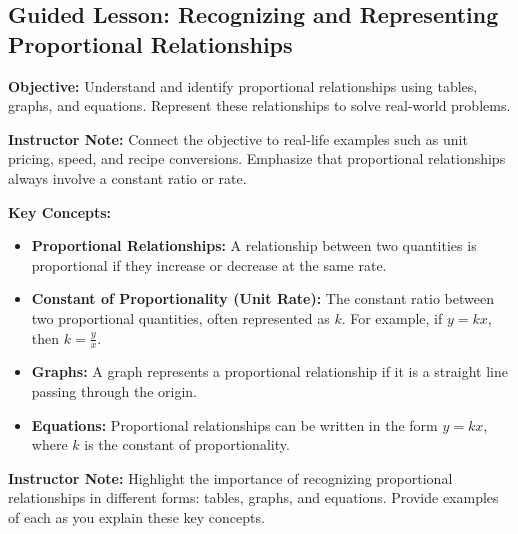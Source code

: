 \documentclass[12pt]{article}
\title{}
\date{}
\begin{document}
\subsection*{Guided Lesson: Recognizing and Representing Proportional Relationships}
\onehalfspacing

\begin{tcolorbox}[colframe=black!40, colback=gray!5, 
coltitle=black, colbacktitle=black!20, fonttitle=\bfseries\Large, 
title=Learning Objective, halign title=center, left=5pt, right=5pt, top=5pt, bottom=15pt]
\textbf{Objective:} Understand and identify proportional relationships using tables, graphs, and equations. Represent these relationships to solve real-world problems.

{\color{blue} \textbf{Instructor Note:} Connect the objective to real-life examples such as unit pricing, speed, and recipe conversions. Emphasize that proportional relationships always involve a constant ratio or rate.}
\end{tcolorbox}

\vspace{1em}

\begin{tcolorbox}[colframe=black!60, colback=white, 
coltitle=black, colbacktitle=black!15, fonttitle=\bfseries\Large, 
title=Key Concepts and Vocabulary, halign title=center, left=10pt, right=10pt, top=10pt, bottom=15pt]
\textbf{Key Concepts:}
\begin{itemize}
    \item \textbf{Proportional Relationships:} A relationship between two quantities is proportional if they increase or decrease at the same rate. 
    \item \textbf{Constant of Proportionality (Unit Rate):} The constant ratio between two proportional quantities, often represented as \(k\). For example, if \( y = kx \), then \(k = \frac{y}{x}\).
    \item \textbf{Graphs:} A graph represents a proportional relationship if it is a straight line passing through the origin.
    \item \textbf{Equations:} Proportional relationships can be written in the form \(y = kx\), where \(k\) is the constant of proportionality.
\end{itemize}

{\color{blue} \textbf{Instructor Note:} Highlight the importance of recognizing proportional relationships in different forms: tables, graphs, and equations. Provide examples of each as you explain these key concepts.}
\end{tcolorbox}
\end{document}
